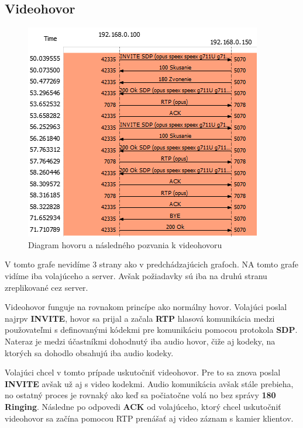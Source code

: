 \documentclass[10pt,oneside,slovak,a4paper]{article}
\begin{document}
\subsection{Videohovor}
\begin{figure}[H]
	\centering
	\includegraphics[scale=0.8]{Videocall.png}
	\caption{Diagram hovoru a následného pozvania k videohovoru}
\end{figure}
V tomto grafe nevidíme 3 strany ako v predchádzajúcich grafoch. NA tomto grafe vidíme iba volajúceho a server. Avšak požiadavky sú iba na druhú stranu zreplikované cez server.

Videohovor funguje na rovnakom princípe ako normálny hovor. Volajúci poslal najrpv \textbf{INVITE}, hovor sa prijal a začala \textbf{RTP} hlasová komunikácia medzi použovateľmi s definovanými kódekmi pre komunikáciu pomocou protokola \textbf{SDP}. Nateraz je medzi účastníkmi dohodnutý iba audio hovor, čiže aj kodeky, na ktorých sa dohodlo obsahujú iba audio kodeky.

Volajúci chcel v tomto prípade uskutočniť videohovor. Pre to sa znova poslal \textbf{INVITE} avšak už aj s video kodekmi. Audio komunikácia avšak stále prebieha, no ostatný proces je rovnaký ako keď sa počiatočne volá no bez správy \textbf{180 Ringing}. Následne po odpovedi \textbf{ACK} od volajúceho, ktorý chcel uskutočniť videohovor sa začína pomocou RTP prenášať aj video záznam s kamier klientov.
\end{document}
